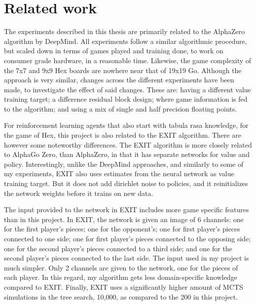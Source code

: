 \chapter{Related work}
The experiments described in this thesis are primarily related to the AlphaZero algorithm by DeepMind\cite{Silver2018}. All experiments follow a similar algorithmic procedure, but scaled down in terms of games played and training done, to work on consumer grade hardware, in a reasonable time. Likewise, the game complexity of the 7x7 and 9x9 Hex boards are nowhere near that of 19x19 Go. Although the approach is very similar, changes across the different experiments have been made, to investigate the effect of said changes. These are: having a different value training target; a difference residual block design; where game information is fed to the algorithm; and using a mix of single and half precision floating points.

For reinforcement learning agents that also start with tabula rasa knowledge, for the game of Hex, this project is also related to the EXIT algorithm\cite{AnthonyThomasandTianZhengandBarber2017}. There are however some noteworthy differences. The EXIT algorithm is more closely related to AlphaGo Zero, than AlphaZero, in that it has separate networks for value and policy. Interestingly, unlike the DeepMind approaches, and similarly to some of my experiments, EXIT also uses estimates from the neural network as value training target. But it does not add dirichlet noise to policies, and it reinitializes the network weights before it trains on new data. 

The input provided to the network in EXIT includes more game specific features than in this project. In EXIT, the network is given an image of 6 channels: one for the first player's pieces; one for the opponent's; one for first player's pieces connected to one side; one for first player's pieces connected to the opposing side; one for the second player's pieces connected to a third side; and one for the second player's pieces connected to the last side\citep{AnthonyThomasandTianZhengandBarber2017}. The input used in my project is much simpler. Only 2 channels are given to the network, one for the pieces of each player. In this regard, my algorithm gets less domain-specific knowledge compared to EXIT. Finally, EXIT uses a significantly higher amount of MCTS simulations in the tree search, 10,000, as compared to the 200 in this project.